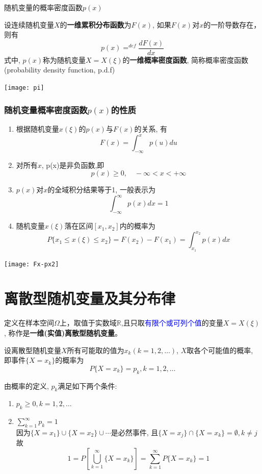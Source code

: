 \begin{frame}{随机变量的概率密度函数$p(x)$}
\begin{definition}
	设连续随机变量$X$的\textbf{一维累积分布函数}为$F(x)$, 如果$F(x)$对$x$的一阶导数存在，则有
	\[p(x)\mathop{=}^{def}\frac{dF(x)}{dx}\]
	式中, $p(x)$称为随机变量$X=X(\xi)$的\textbf{一维概率密度函数}, 简称概率密度函数(probability density function, p.d.f)
\end{definition}
\texttt{[image: pi]}
\end{frame}

\begin{frame}[shrink]
\frametitle{随机变量概率密度函数$p(x)$的性质}
\begin{enumerate}
	\item 根据随机变量$x(\xi)$的$p(x)$与$F(x)$的关系, 有
	\[F(x)=\int_{-\infty}^{x}p(u)du\]
	\item 对所有$x$, p(x)是非负函数,即
	\[p(x)\ge 0,\quad -\infty<x<+\infty \]
	\item $p(x)$对$x$的全域积分结果等于1, 一般表示为
	\[\int_{-\infty}^{\infty}p(x)dx=1\]
	\item 随机变量$x(\xi)$落在区间$[x_1,x_2]$内的概率为
	\[P\{x_1\le x(\xi)\le x_2\}=F(x_2)-F(x_1)=\int_{x_1}^{x_2}p(x)dx\]
\end{enumerate}
\texttt{[image: Fx-px2]}
\end{frame}

\section{离散型随机变量及其分布律}

\begin{frame}[shrink]
\begin{definition}[离散型随机变量]
	定义在样本空间$\Omega$上，取值于实数域$\mathbb{R}$,且只取\textcolor{blue}{有限个或可列个值}的变量$X=X(\xi)$, 称作是\textbf{一维(实值)离散型随机变量}。\\
\end{definition}

\begin{definition}[离散型随机变量的概率]
	设离散型随机变量$X$所有可能取的值为$x_k(k=1,2,\dots)$, $X$取各个可能值的概率, 即事件$\{X=x_k\}$的概率为
	\[P\{X=x_k\}=p_k, k=1,2,\dots\]
\end{definition}

由概率的定义, $p_k$满足如下两个条件: 
\begin{enumerate}
	\item $p_k\ge 0, k=1,2,\dots$
	\item $\sum\limits_{k=1}^{\infty}p_k=1$\\
	因为$\{X=x_1\}\cup\{X=x_2\}\cup\cdots$是必然事件, 且$\{X=x_j\}\cap\{X=x_k\}=\emptyset, k\ne j$故
	\[1=P[\bigcup_{k=1}^{\infty}\{X=x_k\}]=\sum_{k=1}^{\infty}P\{X=x_k\}=1 \]
\end{enumerate}
\end{frame}

